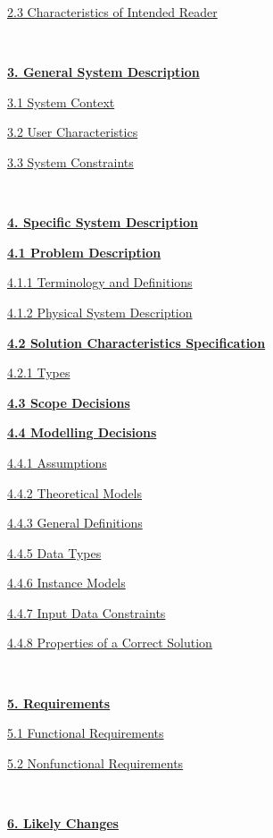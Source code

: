 \documentclass[
]{article}
\begin{document}
\protect\hyperlink{qwwww}{2.3 Characteristics of Intended Reader}

\

\protect\hyperlink{qe}{\textbf{3. General System Description}}

\protect\hyperlink{qee}{3.1 System Context}

\protect\hyperlink{qeee}{3.2 User Characteristics}

\protect\hyperlink{qeeee}{3.3 System Constraints}

\

\textbf{\protect\hyperlink{qr}{4. Specific System Description}}

\textbf{\protect\hyperlink{qrr}{4.1 Problem Description}}

\protect\hyperlink{qrrr}{4.1.1 Terminology and Definitions}

\protect\hyperlink{qrrrr}{4.1.2 Physical System Description}

\textbf{\protect\hyperlink{qrrrrrr}{4.2 Solution Characteristics
Specification}}

\protect\hyperlink{qrrrrrrr}{4.2.1 Types}

\textbf{\protect\hyperlink{qrrrrrrrr}{4.3 Scope Decisions}}

\textbf{\protect\hyperlink{qrrrrrrrrrrr}{4.4 Modelling Decisions}}

\protect\hyperlink{qrrrrrrrrrrrr}{4.4.1 Assumptions}

\protect\hyperlink{qrrrrrrrrrrrrrr}{4.4.2 Theoretical Models}

\protect\hyperlink{qrrrrrrrrrrrrrrr}{4.4.3 General Definitions}

\protect\hyperlink{qkl}{4.4.5 Data Types}

\protect\hyperlink{qrrrrrrrrrrrrrrrrr}{4.4.6 Instance Models}

\protect\hyperlink{qrrrrrrrrrrrrrrrrrr}{4.4.7 Input Data Constraints}

\protect\hyperlink{qrrrrrrrrrrrrrrrrrrr}{4.4.8 Properties of a Correct
Solution}

\

\textbf{\protect\hyperlink{qb}{5. Requirements}}

\protect\hyperlink{qbb}{5.1 Functional Requirements}

\protect\hyperlink{qbbb}{5.2 Nonfunctional Requirements}

\

\textbf{\protect\hyperlink{qn}{6. Likely Changes}}

\
\end{document}
